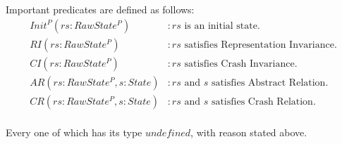\documentclass[a4paper,11pt]{article}
\theoremstyle{definition}
\begin{document}
Important predicates are defined as follows:
\begin{align*}
	\mathit{Init^P(rs : RawState^P)} &: \text{$\mathit{rs}$ is an initial state.}\\
	\mathit{RI(rs : RawState^P)} &: \text{$\mathit{rs}$ satisfies Representation Invariance.} \\
	\mathit{CI(rs : RawState^P)} &: \text{$\mathit{rs}$ satisfies Crash Invariance.} \\
	\mathit{AR(rs : RawState^P, s : State)} &: \text{$\mathit{rs}$ and $s$ satisfies Abstract Relation.} \\
	\mathit{CR(rs : RawState^P, s : State)} &: \text{$\mathit{rs}$ and $s$ satisfies Crash Relation.} \\
\end{align*}

Every one of which has its type $\mathit{undefined}$, with reason stated above. 
\end{document}
